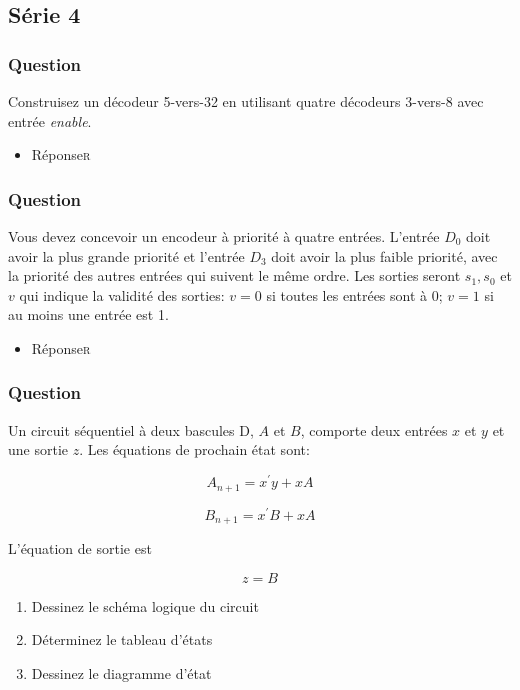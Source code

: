 \documentclass[11pt]{article}
\begin{document}
\subsection*{Série 4}
\label{sec:org0c80653}
\subsubsection*{Question}
\label{sec:orgcca2622}
Construisez un décodeur 5-vers-32 en utilisant quatre décodeurs
  3-vers-8 avec entrée \emph{enable}.

\begin{itemize}
\item Réponse\hfill{}\textsc{r}
\label{sec:orgfd27a4c}
\end{itemize}

\subsubsection*{Question}
\label{sec:org8505058}
Vous devez concevoir un encodeur à priorité à quatre
  entrées. L'entrée \(D_0\) doit avoir la plus grande priorité et
  l'entrée \(D_3\) doit avoir la plus faible priorité, avec la
  priorité des autres entrées qui suivent le même ordre. Les sorties
  seront \(s_1, s_0\) et \(v\) qui indique la validité des sorties:
  \(v=0\) si toutes les entrées sont à 0; \(v=1\) si au moins une
  entrée est 1.

\begin{itemize}
\item Réponse\hfill{}\textsc{r}
\label{sec:orgd8032b3}
\end{itemize}

\subsubsection*{Question}
\label{sec:org4201acf}
Un circuit séquentiel à deux bascules D, \(A\) et \(B\), comporte
  deux entrées \(x\) et \(y\) et une sortie \(z\). Les équations de
  prochain état sont:

$$A_{n+1} = x^\prime y + x A$$

$$B_{n+1} = x^\prime B + x A$$

L'équation de sortie est 

$$z=B$$

\begin{enumerate}
\item Dessinez le schéma logique du circuit

\item Déterminez le tableau d'états

\item Dessinez le diagramme d'état
\end{enumerate}
\end{document}
